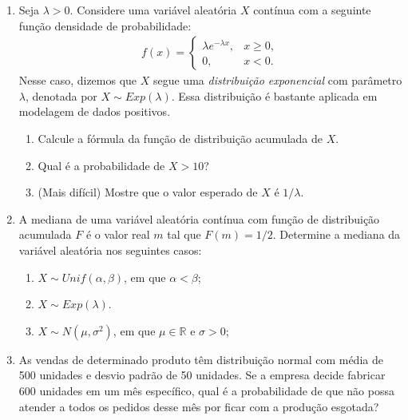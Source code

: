 \documentclass{article}
\begin{document}
\begin{enumerate}
\begin{enumerate}
		\item Calcule $E(Y)$ e $Var(Y)$.
		
		\item Note que $\theta$ representa o comprimento do intervalo em que $Y$ tem probabilidade positiva e $a$ indica o início deste intervalo. No índice anterior, vimos que $Var(Y)$ depende de $\theta$ mas não depende de $a$. Interprete tal resultado.
	\end{enumerate}
	
	\item Seja $\lambda > 0$. Considere uma variável aleatória $X$ contínua com a seguinte função densidade de probabilidade:    
    \begin{align*}
	f(x) = \left\{\begin{array}{ll}
		\lambda e^{ - \lambda x}, & x \geq 0, \\
		0, & x<0.
	\end{array}\right.
	\end{align*}  
	Nesse caso, dizemos que $X$ segue uma {\em distribuição exponencial} com parâmetro $\lambda$, denotada por $X\sim Exp(\lambda)$. Essa distribuição é bastante aplicada em modelagem de dados positivos.
    \begin{enumerate}
		\item Calcule a fórmula da função de distribuição acumulada de $X$.
		\item Qual é a probabilidade de $X>10$?
		\item (Mais difícil) Mostre que o valor esperado de $X$ é $1/\lambda$.
	\end{enumerate}

	\item A mediana de uma variável aleatória contínua com função de distribuição acumulada $F$ é o valor real $m$ tal que $F(m) = 1/2$. Determine a mediana da variável aleatória nos seguintes casos:
	\begin{enumerate}
		\item $X \sim Unif(\alpha, \beta)$, em que $\alpha < \beta$;
		\item $X \sim Exp(\lambda)$.
		\item $X \sim N(\mu, \sigma^2)$, em que $\mu\in\mathbb{R}$ e $\sigma > 0$;
	\end{enumerate}

	\item As vendas de determinado produto têm distribuição normal com média de 500 unidades e desvio padrão de 50 unidades. Se a empresa decide fabricar 600 unidades em um mês específico, qual é a probabilidade de que não possa atender a todos os pedidos desse mês por ficar com a produção esgotada?    
   

\end{enumerate}
\end{document}

